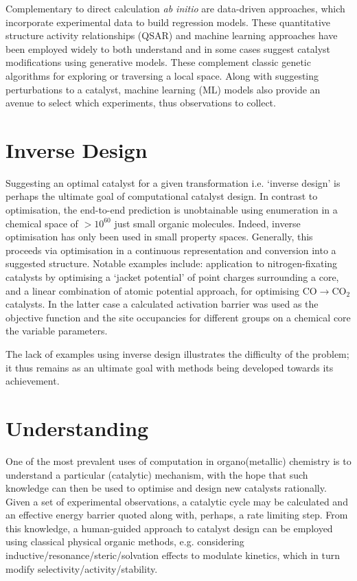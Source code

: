 \documentclass[../main.tex]{subfiles}
\begin{document}
Complementary to direct calculation \emph{ab initio} are data-driven approaches, which  incorporate experimental data to build regression models. These quantitative structure activity relationships (QSAR)\cite{Muratov2020} and machine learning\cite{Toyao2019, Kitchin2018, Friederich2020} approaches have been employed widely to both understand and in some cases suggest catalyst modifications using generative models.\cite{GmezBombarelli2018} These complement classic genetic algorithms for exploring or traversing\cite{Nigam2021} a local space.\cite{goldberg1989genetic} Along with suggesting perturbations to a catalyst, machine learning (ML) models also provide an avenue to select which experiments, thus observations to collect.\cite{Henle2020, Zahrt2021} 

\section{Inverse Design}

Suggesting an optimal catalyst for a given transformation i.e. `inverse design' is perhaps the ultimate goal of computational catalyst design. In contrast to optimisation, the end-to-end prediction is unobtainable using enumeration in a chemical space of $>10^{60}$ just small organic molecules.\cite{Kirkpatrick2004} Indeed, inverse optimisation has only been used in small property spaces.\cite{Freeze2019, Foscato2020} Generally, this proceeds via optimisation in a continuous representation and conversion into a suggested structure. Notable examples include: application to nitrogen-fixating catalysts by optimising a `jacket potential' of point charges surrounding a core,\cite{Weymuth2014} and a linear combination of atomic potential approach, for optimising CO$\rightarrow$CO$_2$ catalysts.\cite{Chang2018} In the latter case a calculated activation barrier was used as the objective function and the site occupancies for different groups on a chemical core the variable parameters. 

The lack of examples using inverse design illustrates the difficulty of the problem; it thus remains as an ultimate goal with methods being developed towards its achievement.


\section{Understanding}

One of the most prevalent uses of computation in organo(metallic) chemistry is to understand a particular (catalytic) mechanism, with the hope that such knowledge can then be used to optimise and design new catalysts rationally.\cite{Norskov2011, Tantillo2016} Given a set of experimental observations, a catalytic cycle may be calculated and an effective energy barrier quoted along with, perhaps, a rate limiting step.\cite{Kozuch2011} From this knowledge, a human-guided approach to catalyst design can be employed using classical physical organic methods, e.g. considering inductive/resonance/steric/solvation effects to modulate kinetics, which in turn modify selectivity/activity/stability.\cite{Anslyn2006} 
\end{document}
